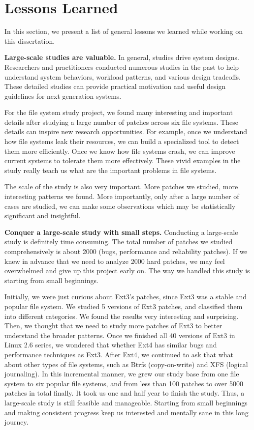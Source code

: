 \section{Lessons Learned}
\label{sec-conc-lessons}

In this section, we present a list of general lessons we learned while
working on this dissertation.  

\vspace{0.1in} \noindent \textbf{Large-scale studies are valuable.} 
In general, studies drive system designs.  Researchers and
practitioners conducted numerous studies in the past to help
understand system behaviors, workload patterns, and various
design tradeoffs.  These detailed studies can provide practical
motivation and useful design guidelines for next generation systems. 

For the file system study project, we found many interesting and
important details after studying a large number of patches across six
file systems. These details can inspire new research opportunities. For 
example, once we understand how file systems leak their resources,
we can build a specialized tool to detect them more efficiently. Once
we know how file systems crash, we can improve current systems to
tolerate them more effectively. These vivid examples in the study
really teach us what are the important problems in file systems.  

The scale of the study is also very important.  More patches we
studied, more interesting patterns we found. More importantly, only
after a large number of cases are studied, we can make some
observations which may be statistically significant and insightful. 

\vspace{0.1in} \noindent \textbf{Conquer a large-scale study with small steps.}
Conducting a large-scale study is definitely time consuming. 
The total number of patches we studied comprehensively is
about 2000 (bugs, performance and reliability patches). If we knew in
advance that we need to analyze 2000 hard patches, we may feel
overwhelmed and give up this project early on. The way we handled this
study is starting from small beginnings. 

Initially, we were just curious about Ext3's patches, since Ext3 was a
stable and popular file system. We studied 5 versions of Ext3 patches,
and classified them into different categories. We found the results
very interesting and surprising.  Then, we thought that we
need to study more patches of Ext3 to better understand the broader
patterns.  Once we finished all 40 versions of Ext3 in Linux 2.6
series, we wondered that whether Ext4 has similar bugs and performance
techniques as Ext3. After Ext4, we continued to ask that what about 
other types of file systems, such as Btrfs (copy-on-write) and XFS
(logical journaling).  In this incremental manner, we grew our study
base from one file system to six popular file systems, and from less
than 100 patches to over 5000 patches in total finally.  It took us
one and half year to finish the study. Thus, a large-scale study is
still feasible and manageable.  Starting from small beginnings and
making consistent progress keep us interested and mentally sane in
this long journey.  


